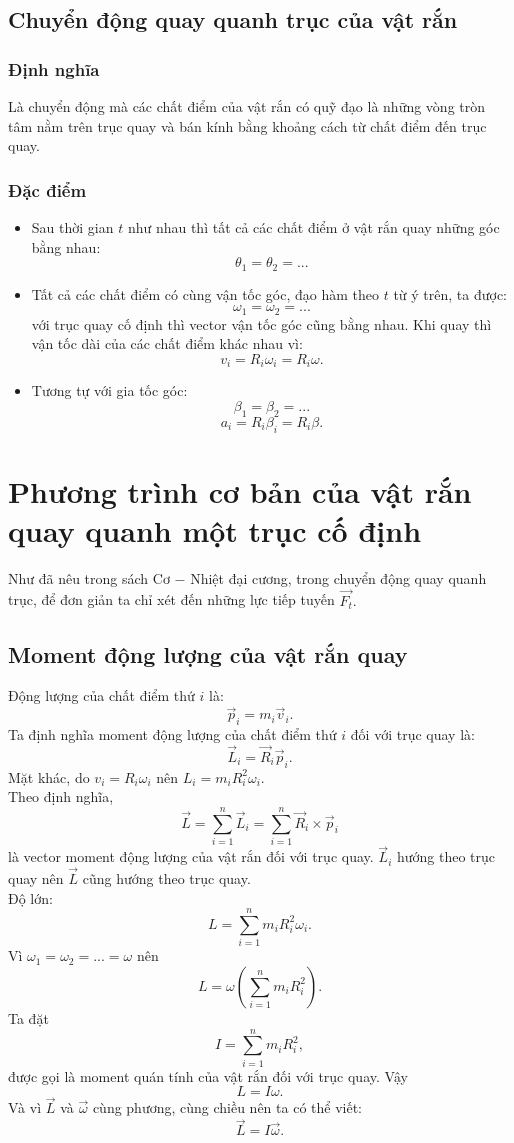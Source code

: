 \subsection{Chuyển động quay quanh trục của vật rắn}
\subsubsection{Định nghĩa}
Là chuyển động mà các chất điểm của vật rắn có quỹ đạo là những vòng tròn tâm nằm trên trục quay và bán kính bằng khoảng cách từ chất điểm đến trục quay.
\subsubsection{Đặc điểm}
\begin{itemize}
\item Sau thời gian $t$ như nhau thì tất cả các chất điểm ở vật rắn quay những góc bằng nhau:
$$\theta_1 = \theta_2 = ... $$
\item Tất cả các chất điểm có cùng vận tốc góc, đạo hàm theo $t$ từ ý trên, ta được:
$$\omega_1 = \omega_2 = ... $$
với trục quay cố định thì vector vận tốc góc cũng bằng nhau.
Khi quay thì vận tốc dài của các chất điểm khác nhau vì:
$$v_i = R_i \omega_i = R_i \omega.$$
\item Tương tự với gia tốc góc:
$$\beta_1 = \beta_2 = ... $$
$$a_i = R_i \beta_i = R_i \beta.$$
\end{itemize}
\section{Phương trình cơ bản của vật rắn quay quanh một trục cố định}
Như đã nêu trong sách Cơ $-$ Nhiệt đại cương, trong chuyển động quay quanh trục, để đơn giản ta chỉ xét đến những lực tiếp tuyến $\overrightarrow{F_t}.$
\subsection{Moment động lượng của vật rắn quay}
Động lượng của chất điểm thứ $i$ là:
$$\overrightarrow{p}_i = m_i \overrightarrow{v}_i.$$
Ta định nghĩa moment động lượng của chất điểm thứ $i$ đối với trục quay là:
$$\overrightarrow{L}_i = \overrightarrow{R}_i \overrightarrow{p}_i.$$
Mặt khác, do $v_i = R_i \omega_i$ nên $L_i = m_i R_i^2 \omega_i.$\\
Theo định nghĩa,
$$\overrightarrow L  = \sum\limits_{i = 1}^n {{{\overrightarrow L }_i}}  = \sum\limits_{i = 1}^n {{{\overrightarrow R }_i} \times {{\overrightarrow p }_i}} $$
là vector moment động lượng của vật rắn đối với trục quay.
$\overrightarrow{L}_i$ hướng theo trục quay nên $\overrightarrow{L}$ cũng hướng theo trục quay.\\
Độ lớn:
$$L = \sum\limits_{i = 1}^n {{m_i}R_i^2{\omega _i}} .$$
Vì $\omega_1 = \omega_2 = ... = \omega$ nên
$$L = \omega \left( {\sum\limits_{i = 1}^n {{m_i}R_i^2} } \right).$$
Ta đặt 
$$I = \sum\limits_{i = 1}^n {{m_i}R_i^2} ,$$
được gọi là moment quán tính của vật rắn đối với trục quay. Vậy
$$L = I \omega.$$
Và vì $\overrightarrow{L}$ và $\overrightarrow{\omega}$ cùng phương, cùng chiều nên ta có thể viết:
$$\overrightarrow{L} = I \overrightarrow{\omega}.$$
